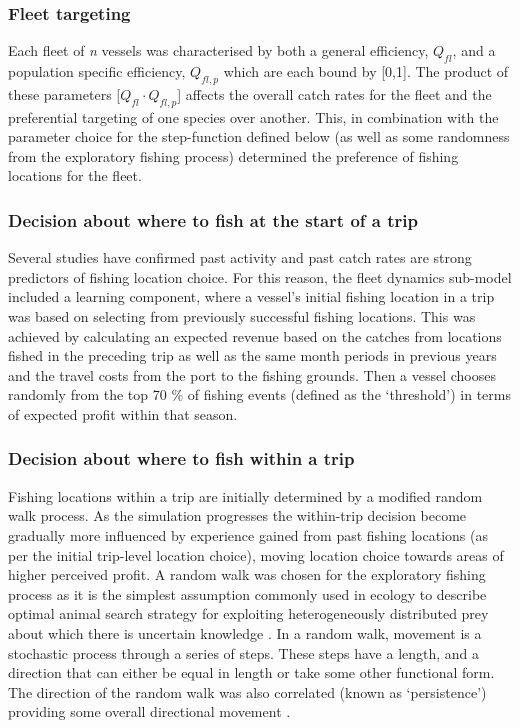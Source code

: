 \documentclass[review]{elsarticle}
\begin{document}
\subsubsection{Fleet targeting}

Each fleet of \textit{n} vessels was characterised by both a general
efficiency, $Q_{fl}$, and a population specific efficiency, ${Q_{fl, p}}$ which
are each bound by [0,1]. The product of these parameters [$Q_{fl} \cdot
Q_{fl, p}$] affects the overall catch rates for the fleet and the preferential
targeting of one species over another. This, in combination with the
parameter choice for the step-function defined below (as well as some
randomness from the exploratory fishing process) determined the preference of
fishing locations for the fleet.  

\subsubsection{Decision about where to fish at the start of a trip}

Several studies \citep[for a review see][]{Girardin2016} have confirmed past activity
and past catch rates are strong predictors of fishing location choice. For this
reason, the fleet dynamics sub-model included a learning component, where a
vessel's initial fishing location in a trip was based on selecting from
previously successful fishing locations. This was achieved by calculating an
expected revenue based on the catches from locations fished in the preceding
trip as well as the same month periods in previous years and the travel costs
from the port to the fishing grounds. Then a vessel chooses randomly from the
top 70 \% of fishing events (defined as the `threshold') in terms of expected
profit within that season. 

\subsubsection{Decision about where to fish within a trip}

Fishing locations within a trip are initially determined by a modified random
walk process. As the simulation progresses the within-trip decision become
gradually more influenced by experience gained from past fishing locations (as
per the initial trip-level location choice), moving location choice towards
areas of higher perceived profit. A random walk was chosen for the exploratory
fishing process as it is the simplest assumption commonly used in ecology to
describe optimal animal search strategy for exploiting heterogeneously
distributed prey about which there is uncertain knowledge
\citep{Viswanathan1999}. In a random walk, movement is a stochastic process
through a series of steps. These steps have a length, and a direction that can
either be equal in length or take some other functional form. The direction of
the random walk was also correlated (known as `persistence') providing some
overall directional movement \citep{Codling2008}. \\
\end{document}
